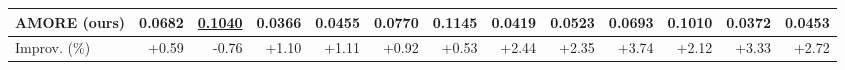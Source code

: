 \begin{table}[t]
{\begin{tabular}{lrrrrrrrrrrrr}
AMORE (ours) & \textbf{0.0682} & \underline{0.1040} & \textbf{0.0366} & \textbf{0.0455} & \textbf{0.0770} & \textbf{0.1145} & \textbf{0.0419} & \textbf{0.0523} & \textbf{0.0693} & \textbf{0.1010} & \textbf{0.0372} & \textbf{0.0453} \\
\midrule
Improv. (\%) & +0.59 & -0.76 & +1.10 & +1.11 & +0.92 & +0.53 & +2.44 & +2.35 & +3.74 & +2.12 & +3.33 & +2.72 \\
\bottomrule
\end{tabular}}
\end{table}
